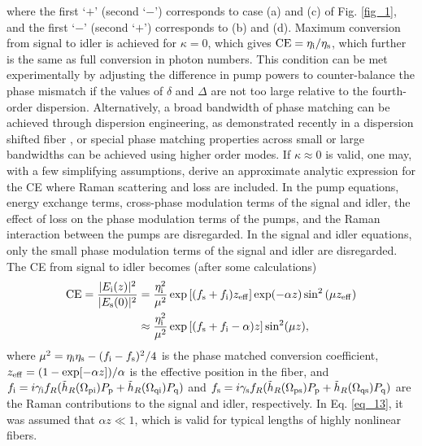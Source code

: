 \documentclass[10pt,letterpaper]{article}
\begin{document}
where the first `$+$' (second `$-$') corresponds to case (a) and (c) of Fig. \ref{fig_1}, and the first `$-$' (second `$+$') corresponds to (b) and (d). Maximum conversion from signal to idler is achieved for $\kappa = 0$, which gives $\rm{CE} = \eta_{\rm i}/\eta_{\rm s}$, which further is the same as full conversion in photon numbers. This condition can be met experimentally by adjusting the difference in pump powers to counter-balance the phase mismatch if the values of $\delta$ and $\Delta$ are not too large relative to the fourth-order dispersion. Alternatively, a broad bandwidth of phase matching can be achieved through dispersion engineering, as demonstrated recently in a dispersion shifted fiber \cite{Farsi_2015}, or special phase matching properties across small \cite{Friis_2016} or large \cite{Demas_2015} bandwidths can be achieved using higher order modes. If $\kappa \approx 0$ is valid, one may, with a few simplifying assumptions, derive an approximate analytic expression for the CE where Raman scattering and loss are included. In the pump equations, energy exchange terms, cross-phase modulation terms of the signal and idler, the effect of loss on the phase modulation terms of the pumps, and the Raman interaction between the pumps are disregarded. In the signal and idler equations, only the small phase modulation terms of the signal and idler are disregarded. The CE from signal to idler becomes (after some calculations)
\begin{align} \label{eq_14}
{\rm CE} = \frac{|E_{\rm i}(z)|^2}{|E_{\rm s}(0)|^2} &=\frac{\eta_{\rm i}^2}{\mu^2} \exp\left[(f_{\rm s}+f_{\rm i})z_{\rm eff}\right] \exp(-\alpha z) \sin^2\left( \mu z_{\rm eff} \right)\\ \label{eq_13}
&\approx \frac{\eta_{\rm i}^2}{\mu^2}\exp\left[(f_{\rm s}+f_{\rm i}-\alpha)z\right]\sin^2(\mu z),
\end{align}
where $\mu^2 = \eta_{\rm i}\eta_{\rm s}-(f_{\rm i} - f_{\rm s})^2/4 $ is the phase matched conversion coefficient, $z_{\rm eff} = (1-\exp[-\alpha z])/\alpha$ is the effective position in the fiber, and $f_{\rm i} = i\gamma_{\rm i}f_R(\tilde h_R(\Omega_{\rm pi})P_{\rm p} + \tilde h_R(\Omega_{\rm qi})P_{\rm q})$ and $f_{\rm s} = i\gamma_{\rm s}f_R(\tilde h_R(\Omega_{\rm ps})P_{\rm p} + \tilde h_R(\Omega_{\rm qs})P_{\rm q})$ are the Raman contributions to the signal and idler, respectively. In Eq. \eqref{eq_13}, it was assumed that $\alpha z \ll 1$, which is valid for typical lengths of highly nonlinear fibers.
\end{document}
